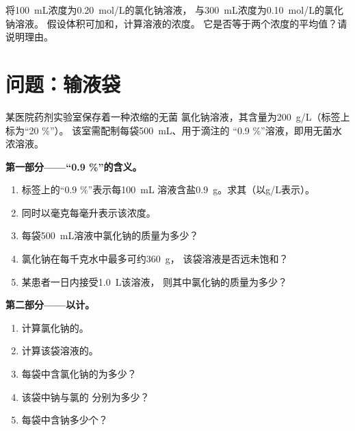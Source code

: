 \begin{exercise}[$\star\star\star$]\label{exo:g10:concentration-and-dilution:15}
将\qty{100}{mL}浓度为\qty{0.20}{mol/L}的氯化钠溶液，
与\qty{300}{mL}浓度为\qty{0.10}{mol/L}的氯化钠溶液。
假设体积可加和，计算溶液的浓度。
它是否等于两个浓度的平均值？请说明理由。
\end{exercise}

\section{问题：输液袋}

\begin{problem}
\label{pb:g10:concentration-and-dilution:1}
某医院药剂实验室保存着一种浓缩的无菌
氯化钠溶液，其含量为\qty{200}{g/L}（标签上标为“20 \%”）。
该室需配制每袋\qty{500}{mL}、用于滴注的
“0.9 \%”溶液，即用无菌水浓溶液。

\medskip
\noindent\textbf{第一部分——“0.9 \%”的含义。}
\begin{enumerate}
  \item 标签上的“0.9 \%”表示每\qty{100}{mL}
        溶液含盐\qty{0.9}{g}。求其（以\si{g/L}表示）。
  \item 同时以毫克每毫升表示该浓度。
  \item 每袋\qty{500}{mL}溶液中氯化钠的质量为多少？
  \item 氯化钠在每千克水中最多可约\qty{360}{g}，
        该袋溶液是否远未饱和？
  \item 某患者一日内接受\qty{1.0}{L}该溶液，
        则其中氯化钠的质量为多少？
\end{enumerate}

\medskip
\noindent\textbf{第二部分——以计。}
\begin{enumerate}[resume]
  \item 计算氯化钠的。
  \item 计算该袋溶液的。
  \item 每袋中含氯化钠的为多少？
  \item 该袋中钠与氯的
        分别为多少？
  \item 每袋中含钠多少个？
\end{enumerate}


\end{problem}
